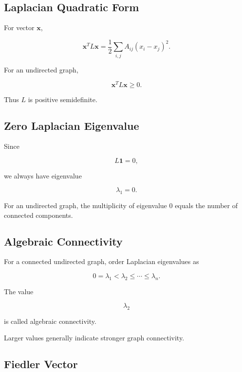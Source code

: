 \subsection{Laplacian Quadratic Form}
\label{subsec:laplacian-quadratic-form}

For vector \(\mathbf{x}\),

\[
\boxed{
\mathbf{x}^TL\mathbf{x}
=
\frac12
\sum_{i,j}
A_{ij}
(x_i-x_j)^2.
}
\]

For an undirected graph,

\[
\boxed{
\mathbf{x}^TL\mathbf{x}\geq0.
}
\]

Thus \(L\) is positive semidefinite.

\subsection{Zero Laplacian Eigenvalue}
\label{subsec:zero-laplacian-eigenvalue}

Since

\[
L\mathbf{1}=0,
\]

we always have eigenvalue

\[
\boxed{
\lambda_1=0.
}
\]

For an undirected graph, the multiplicity of eigenvalue \(0\) equals the
number of connected components.

\subsection{Algebraic Connectivity}
\label{subsec:algebraic-connectivity}

For a connected undirected graph, order Laplacian eigenvalues as

\[
0
=
\lambda_1
<
\lambda_2
\leq
\cdots
\leq
\lambda_n.
\]

The value

\[
\boxed{
\lambda_2
}
\]

is called algebraic connectivity.

Larger values generally indicate stronger graph connectivity.

\subsection{Fiedler Vector}
\label{subsec:fiedler-vector}

